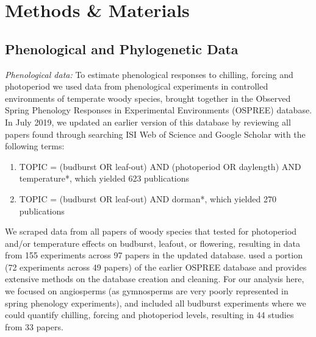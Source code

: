 \documentclass[11pt]{article}
\begin{document}
\section*{Methods \& Materials} 

\subsection*{Phenological and Phylogenetic Data}
\emph{Phenological data:} To estimate phenological responses to chilling, forcing and photoperiod we used data from phenological experiments in controlled environments of temperate woody species, brought together in the Observed Spring Phenology Responses in Experimental Environments (OSPREE) database. In July 2019, we updated an earlier version of this database \citep{wolkovich2019} by reviewing all papers found through searching ISI Web of Science and Google Scholar with the following terms: 
\begin{enumerate}
\item TOPIC = (budburst OR leaf-out) AND (photoperiod OR daylength) AND temperature*, which yielded 623 publications
\item TOPIC = (budburst OR leaf-out) AND dorman*, which yielded 270 publications
\end{enumerate}
We scraped data from all papers of woody species that tested for photoperiod and/or temperature effects on budburst, leafout, or flowering, resulting in data from 155 experiments across 97 papers in the updated database. \citet{ettinger2020} used a portion (72 experiments across 49 papers) of the earlier OSPREE database and provides extensive methods on the database creation and cleaning. For our analysis here, we focused on angiosperms (as gymnosperms are very poorly represented in spring phenology experiments), and included all budburst experiments where we could quantify chilling, forcing and photoperiod levels, resulting in 44 studies from 33 papers. 
\end{document}

